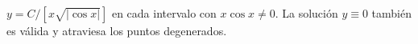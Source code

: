 $y=C/[x\sqrt{|\cos x|}]$ en cada intervalo con $x\cos x\ne0$. La solución $y\equiv0$ también es válida y atraviesa los puntos degenerados.
